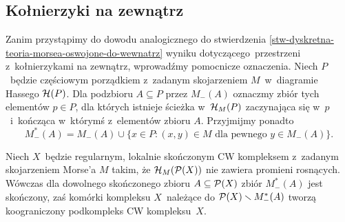 \subsection{Kołnierzyki na zewnątrz}
Zanim przystąpimy do dowodu analogicznego do stwierdzenia \ref{stw-dyskretna-teoria-morsea-oswojone-do-wewnatrz} wyniku  dotyczącego~przestrzeni z~kołnierzykami na zewnątrz, wprowadźmy pomocnicze oznaczenia. Niech $P$~będzie częściowym porządkiem z~zadanym skojarzeniem $M$~w~diagramie Hassego $\mathcal{H}(P)$. Dla podzbioru $A\subseteq P$ przez $M_-(A)$ oznaczmy zbiór tych elementów $p\in P$, dla których istnieje ścieżka w~$\mathcal{H}_M(P)$ zaczynająca się w~$p$~i~kończąca w~którymś z~elementów zbioru $A$. Przyjmijmy ponadto \[M^*_-(A)=M_-(A)\cup \{x\in P:(x,y)\in M \text{ dla pewnego }y\in M_-(A)\}.\]

\begin{lem}\label{lem-dopelnienie_M_minus_gwiazdka_tworzy_podkompleks}
Niech $X$~będzie regularnym, lokalnie skończonym CW kompleksem z~zadanym skojarzeniem Morse'a $M$ takim, że $\mathcal{H}_M(\mathcal{P}(X))$ nie zawiera promieni rosnących. Wówczas dla dowolnego skończonego zbioru $A\subseteq \mathcal{P}(X)$ zbiór $M_-^*(A)$ jest skończony, zaś komórki kompleksu $X$~należące do $\mathcal{P}(X)\smallsetminus M_-^*(A)$ tworzą koograniczony podkompleks CW kompleksu~$X$.
\end{lem}
